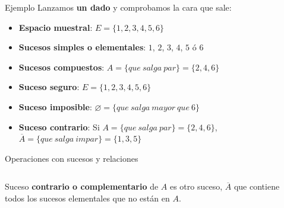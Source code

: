 \documentclass[11pt,handout]{beamer}
\begin{document}
\begin{frame}{Ejemplo}
Lanzamos \textbf{un dado} y comprobamos la cara que sale:
\begin{itemize}[<+->]
\item \textbf{Espacio muestral}: $E=\lbrace 1,2,3,4,5,6 \rbrace $
\item \textbf{Sucesos simples o elementales}: $1$, $2$, $3$, $4$, $5$ ó $6$
\item \textbf{Sucesos compuestos}: $A=\lbrace que\ salga\ par\rbrace=\lbrace2,4,6\rbrace$
\item \textbf{Suceso seguro}: $E=\lbrace 1,2,3,4,5,6 \rbrace $
\item \textbf{Suceso imposible}: $\varnothing=\lbrace que\ salga \ mayor \ que \ 6\rbrace$
\item \textbf{Suceso contrario}: Si $A=\lbrace que\ salga\ par\rbrace=\lbrace2,4,6\rbrace$, $\overline{A}=\lbrace que\ salga\ impar\rbrace=\lbrace1,3,5\rbrace$ 
\end{itemize}
\end{frame}
\begin{frame}
{Operaciones con sucesos y relaciones}
\begin{columns}
\begin{column}{0.7\textwidth}
\begin{block}{}
Suceso \textbf{contrario o complementario} de $A$ es otro suceso, $\overline{A}$ que contiene todos los sucesos elementales que no están en $A$.
\end{block}

\end{column}
\begin{column}{0.3\textwidth}
\scalebox{.6}{}

\end{column}
\end{columns}



\end{frame}
\end{document}
